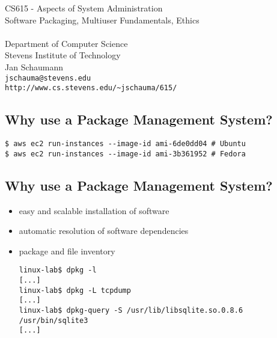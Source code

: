 \documentclass[xga]{xdvislides}
\begin{document}
\setfontphv

\lhead{\slidetitle}                               %
\cfoot{\relax}                               %
\rfoot{\Gray{\today}}

\vspace*{\fill}
\begin{center}
	\Hugesize
		CS615 - Aspects of System Administration\\ [1em]
		Software Packaging, Multiuser Fundamentals, Ethics\\ [1em]
	\hspace*{5mm}\blueline\\ [1em]
	\Normalsize
		Department of Computer Science\\
		Stevens Institute of Technology\\
		Jan Schaumann\\
		\verb+jschauma@stevens.edu+\\
		\verb+http://www.cs.stevens.edu/~jschauma/615/+
\end{center}
\vspace*{\fill}

\subsection{Why use a Package Management System?}
\begin{verbatim}
$ aws ec2 run-instances --image-id ami-6de0dd04 # Ubuntu
$ aws ec2 run-instances --image-id ami-3b361952 # Fedora
\end{verbatim}

\subsection{Why use a Package Management System?}
\begin{itemize}
	\item easy and scalable installation of software
	\item automatic resolution of software dependencies
	\item package and file inventory \\
\begin{verbatim}
linux-lab$ dpkg -l
[...]
linux-lab$ dpkg -L tcpdump
[...]
linux-lab$ dpkg-query -S /usr/lib/libsqlite.so.0.8.6 /usr/bin/sqlite3
[...]

\end{verbatim}
\end{itemize}
\end{document}
